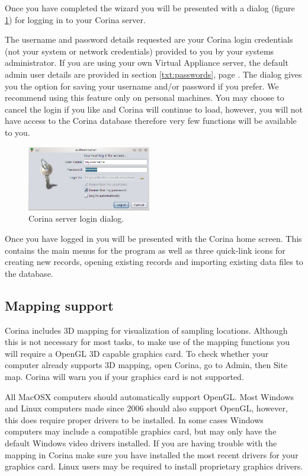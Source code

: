 Once you have completed the wizard you will be presented with a dialog (figure \ref{fig:login}) for logging in to your Corina server.

The username and password details requested are your Corina login credentials (not your system or network credentials) provided to you by your systems administrator.  If you are using your own Virtual Appliance server, the default admin user details are provided in section \ref{txt:passwords}, page \pageref{txt:passwords}.  The dialog gives you the option for saving your username and/or password if you prefer.  We recommend using this feature only on personal machines.  You may choose to cancel the login if you like and Corina will continue to load, however, you will not have access to the Corina database therefore very few functions will be available to you.

\begin{figure}
  \begin{center}
    \includegraphics[width=0.48\textwidth]{Images/login.png}
  \end{center}
  \caption{Corina server login dialog.}
  \label{fig:login}
\end{figure}

Once you have logged in you will be presented with the Corina home screen.  This contains the main menus for the program as well as three quick-link icons for creating new records, opening existing records and importing existing data files to the database.


\subsection{Mapping support}
Corina includes 3D mapping for visualization of sampling locations. Although this is not necessary for most tasks, to make use of the mapping functions you will require a OpenGL 3D capable graphics card. To check whether your computer already supports 3D mapping, open Corina, go to Admin, then Site map.  Corina will warn you if your graphics card is not supported.

All MacOSX computers should automatically support OpenGL.  Most Windows and Linux computers made since 2006 should also support OpenGL, however, this does require proper drivers to be installed. In some cases Windows computers may include a compatible graphics card, but may only have the default Windows video drivers installed.  If you are having trouble with the mapping in Corina make sure you have installed the most recent drivers for your graphics card.  Linux users may be required to install proprietary graphics drivers.  

